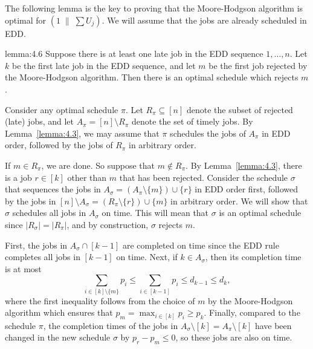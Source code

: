The following lemma is the key to proving that the Moore-Hodgson algorithm is 
optimal for $(1\;\|\;\sum U_j)$. We will assume that the jobs are already scheduled 
in EDD. 

\begin{lemma}{lemma:4.6}
    Suppose there is at least one late job in the EDD sequence $1, \dots, n$. 
    Let $k$ be the first late job in the EDD sequence, and let $m$ be the first 
    job rejected by the Moore-Hodgson algorithm. Then there is an optimal 
    schedule which rejects $m$. 
\end{lemma}
\begin{pf}
    Consider any optimal schedule $\pi$. Let $R_\pi \subseteq [n]$ denote 
    the subset of rejected (late) jobs, and let $A_\pi = [n] \setminus R_\pi$ 
    denote the set of timely jobs. By Lemma~\ref{lemma:4.3}, we may assume that 
    $\pi$ schedules the jobs of $A_\pi$ in EDD order, followed by the 
    jobs of $R_\pi$ in arbitrary order. 

    If $m \in R_\pi$, we are done. So suppose that $m \notin R_\pi$. 
    By Lemma~\ref{lemma:4.3}, there is a job $r \in [k]$ other than $m$ 
    that has been rejected. Consider the schedule $\sigma$ that sequences 
    the jobs in $A_\sigma = (A_\pi \setminus \{m\}) \cup \{r\}$ in EDD 
    order first, followed by the jobs in $[n] \setminus A_\sigma = 
    (R_\pi \setminus \{r\}) \cup \{m\}$ in arbitrary order. We will show that 
    $\sigma$ schedules all jobs in $A_\sigma$ on time. This will mean that 
    $\sigma$ is an optimal schedule since $|R_\sigma| = |R_\pi|$, 
    and by construction, $\sigma$ rejects $m$.

    First, the jobs in $A_\sigma \cap [k-1]$ are completed on time 
    since the EDD rule completes all jobs in $[k-1]$ on time. Next, 
    if $k \in A_\sigma$, then its completion time is at most 
    \[ \sum_{i\in[k] \setminus \{m\}} p_i \leq 
    \sum_{i\in[k-1]} p_i \leq d_{k-1} \leq d_k, \] 
    where the first inequality follows from the choice of $m$ by the 
    Moore-Hodgson algorithm which ensures that $p_m = 
    \max_{i\in[k]} p_i \geq p_k$. Finally, compared to the schedule $\pi$, 
    the completion times of the jobs in $A_\sigma \setminus [k] = 
    A_\pi \setminus [k]$ have been changed in the new schedule $\sigma$
    by $p_r - p_m \leq 0$, so these jobs are also on time. 
\end{pf}
 
